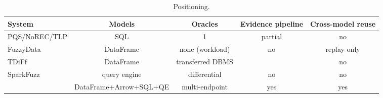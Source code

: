 \begin{table}[t]
\caption{Positioning. }
\label{tab:related}
\small
\begin{tabular}{@{}lcccc@{}}
\toprule
System & Models & Oracles & Evidence pipeline & Cross-model reuse \\
\midrule
PQS/NoREC/TLP & SQL & 1 & partial & no \\
FuzzyData & DataFrame & none (workload) & no & replay only \\
TDiFf & DataFrame & transferred DBMS & \todo{} & no \\
SparkFuzz & query engine & differential & no & no \\
\sys{} & DataFrame+Arrow+SQL+QE & multi-endpoint & yes & yes \\
\bottomrule
\end{tabular}
\end{table}
